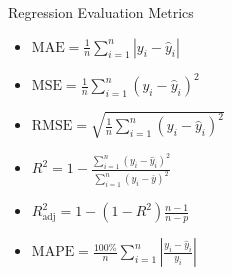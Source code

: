 \begin{frame}{Regression Evaluation Metrics}
	\small
	\begin{itemize}
		\setlength{\itemsep}{0.8em}
		
		\item  $
		\mathrm{MAE}=\frac{1}{n}\sum_{i=1}^{n}|y_i-\hat{y}_i|$		
		\item $
		\mathrm{MSE}=\frac{1}{n}\sum_{i=1}^{n}(y_i-\hat{y}_i)^2$
		
		\item 
		$
		\mathrm{RMSE}=\sqrt{\frac{1}{n}\sum_{i=1}^{n}(y_i-\hat{y}_i)^2}
		$
		
		\item
		$
		R^2=1-\frac{\sum_{i=1}^{n}(y_i-\hat{y}_i)^2}
		{\sum_{i=1}^{n}(y_i-\bar{y})^2}
		$
		
		\item 
		$
		R_{\mathrm{adj}}^2=1-(1-R^2)\frac{n-1}{n-p}
		$
		
		\item
		$
		\mathrm{MAPE}=\frac{100\%}{n}\sum_{i=1}^{n}
		\left|\frac{y_i-\hat{y}_i}{y_i}\right|
		$
	\end{itemize}
\end{frame}
